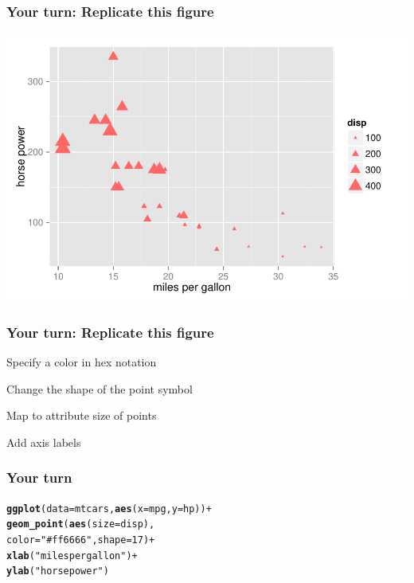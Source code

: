 \documentclass[12pt]{beamer}\usepackage[]{graphicx}\usepackage[]{color}
\makeatletter
\newcommand{\hlnum}[1]{\textcolor[rgb]{0.686,0.059,0.569}{#1}}%
\newcommand{\hlstr}[1]{\textcolor[rgb]{0.192,0.494,0.8}{#1}}%
\newcommand{\hlopt}[1]{\textcolor[rgb]{0,0,0}{#1}}%
\newcommand{\hlstd}[1]{\textcolor[rgb]{0.345,0.345,0.345}{#1}}%
\newcommand{\hlkwc}[1]{\textcolor[rgb]{0.333,0.667,0.333}{#1}}%
\newcommand{\hlkwd}[1]{\textcolor[rgb]{0.737,0.353,0.396}{\textbf{#1}}}%
\newenvironment{kframe}{%
 \def\at@end@of@kframe{}%
 \ifinner\ifhmode%
  \def\at@end@of@kframe{\end{minipage}}%
  \begin{minipage}{\columnwidth}%
 \fi\fi%
 \def\FrameCommand##1{\hskip\@totalleftmargin \hskip-\fboxsep
 \colorbox{shadecolor}{##1}\hskip-\fboxsep
     \hskip-\linewidth \hskip-\@totalleftmargin \hskip\columnwidth}%
 \MakeFramed {\advance\hsize-\width
   \@totalleftmargin\z@ \linewidth\hsize
   \@setminipage}}%
 {\par\unskip\endMakeFramed%
 \at@end@of@kframe}
\newenvironment{knitrout}{}{} %
\makeatother
\begin{document}
\begin{frame}[fragile]
\frametitle{Your turn: Replicate this figure}
\begin{knitrout}\scriptsize
{}\color{fgcolor}

{\centering \includegraphics[width=.8\linewidth,height=.6\linewidth]{figure/your_xyplot1-1} 

}



\end{knitrout}
\end{frame}


\begin{frame}[fragile]
\frametitle{Your turn: Replicate this figure}
\bi
  \item Specify a color in hex notation
  \item Change the shape of the point symbol
  \item Map  to attribute size of points
  \item Add axis labels
\ei
\end{frame}


\begin{frame}[fragile]
\frametitle{Your turn}
\begin{knitrout}\footnotesize
{}\color{fgcolor}\begin{kframe}
\begin{alltt}
\hlkwd{ggplot}\hlstd{(}\hlkwc{data} \hlstd{= mtcars,} \hlkwd{aes}\hlstd{(}\hlkwc{x} \hlstd{= mpg,} \hlkwc{y} \hlstd{= hp))} \hlopt{+}
  \hlkwd{geom_point}\hlstd{(}\hlkwd{aes}\hlstd{(}\hlkwc{size} \hlstd{= disp),}
             \hlkwc{color} \hlstd{=} \hlstr{"#ff6666"}\hlstd{,} \hlkwc{shape} \hlstd{=} \hlnum{17}\hlstd{)} \hlopt{+}
  \hlkwd{xlab}\hlstd{(}\hlstr{"miles per gallon"}\hlstd{)} \hlopt{+}
  \hlkwd{ylab}\hlstd{(}\hlstr{"horse power"}\hlstd{)}
\end{alltt}
\end{kframe}
\end{knitrout}
\end{frame}
\end{document}
